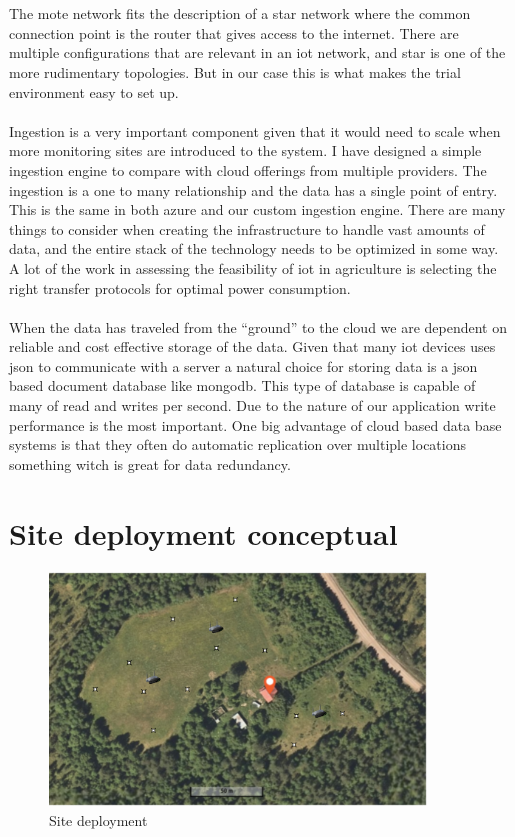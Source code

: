 \documentclass[]{uiophd}
\begin{document}
\\\\
The mote network fits the description of a star network where the common connection point is the router that gives access to the internet. There are multiple configurations that are relevant in an iot network, and star is one of the more rudimentary topologies. But in our case this is what makes the trial environment easy to set up.
\\\\
Ingestion is a very important component given that it would need to scale when more monitoring sites are introduced to the system. I have designed a simple ingestion engine to compare with cloud offerings from multiple providers. The ingestion is a one to many relationship and the data has a single point of entry. This is the same in both azure and our custom ingestion engine. There are many things to consider when creating the infrastructure to handle vast amounts of data, and the entire stack of the technology needs to be optimized in some way. A lot of the work in assessing the feasibility of iot in agriculture is selecting the right transfer protocols for optimal power consumption.
\\\\
 When the data has traveled from the “ground” to the cloud we are dependent on reliable and cost effective storage of the data. Given that many iot devices uses json to communicate with a server a natural choice for storing data is a json based document database like mongodb. This type of database is capable of many of read and writes per second. Due to the nature of our application write performance is the most important. One big advantage of cloud based data base systems is that they often do automatic replication over multiple locations something witch is great for data redundancy.
 
 \section{Site deployment conceptual}
 \begin{figure}[h]
\caption{Site deployment}
\centering
\includegraphics[width=10cm]{hjemly.png}
\end{figure}
\end{document}
